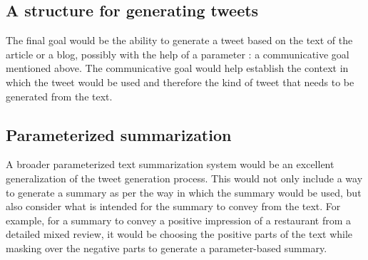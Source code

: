 \subsection{A structure for generating tweets}
The final goal would be the ability to generate a tweet based on the text of the article or a blog, possibly with the help of a parameter : a communicative goal mentioned above. The communicative goal would help establish the context in which the tweet would be used and therefore the kind of tweet that needs to be generated from the text.  

\subsection{Parameterized summarization}
A broader parameterized text summarization system would be an excellent generalization of the tweet generation process. This would not only include a way to generate a summary as per the way in which the summary would be used, but also consider what is intended for the summary to convey from the text. For example, for a summary to convey a positive impression of a restaurant from a detailed mixed review, it would be choosing the positive parts of the text while masking over the negative parts to generate a parameter-based summary.